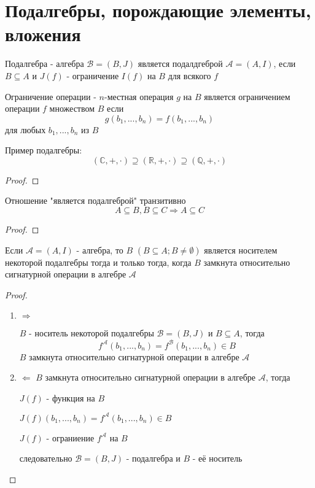 \documentclass[../main/document.tex]{subfiles}
\begin{document}
\section{Подалгебры, порождающие элементы,\\ вложения}

\begin{dfn}[Подалгебра]
Подалгебра - алгебра $\mathcal{B}=(B,J)$ является подалдгеброй $\mathcal{A}=(A,I)$, если $B\subseteq A$ и $J(f)$ - ограничение $I(f)$ на $B$ для всякого $f$
\end{dfn}
\begin{dfn}
Ограничение операции - $n$-местная операция $g$ на $B$ является ограничением операции $f$ множеством $B$ если 
$$g(b_1,...,b_n)=f(b_1,...,b_n)$$
для любых $b_1,...,b_n$ из $B$
\end{dfn}
\begin{exm}

\end{exm}
\begin{exm}
Пример подалгебры:
$$(\mathbb{C},+,\cdot)\supseteq (\mathbb{R},+,\cdot)\supseteq (\mathbb{Q},+,\cdot)$$
\begin{proof}

\end{proof}
\end{exm}
\begin{cnsq}
Отношение "является подалгеброй" транзитивно
$$A\subseteq B, B\subseteq C \Rightarrow A\subseteq C$$
\begin{proof}

\end{proof}
\end{cnsq}
\begin{thm}\label{carrier-theorem}
Если $\mathcal{A}=(A,I)$ - алгебра, то $B$ $(B\subseteq A; B\neq \emptyset)$ является носителем некоторой подалгебры тогда и только тогда, когда $B$ замкнута относительно сигнатурной операции в алгебре $\mathcal{A}$
\begin{proof}
\begin{enumerate}
\item $\Rightarrow$

$B$ - носитель некоторой подалгебры $\mathcal{B}=(B,J)$ и $B\subseteq A$, тогда
$$f^{\mathcal{A}}(b_1,...,b_n)=f^{\mathcal{B}}(b_1,...,b_n)\in B$$
$B$ замкнута относительно сигнатурной операции в алгебре $\mathcal{A}$
\item $\Leftarrow$
$B$ замкнута относительно сигнатурной операции в алгебре $\mathcal{A}$, тогда

$J(f)$ - функция на $B$

$J(f)(b_1,...,b_n)=f^{\mathcal{A}}(b_1,...,b_n)\in B$

$J(f)$ - ограниение $f^{\mathcal{A}}$  на $B$

следовательно $\mathcal{B}=(B,J)$ - подалгебра и $B$ - её носитель
\end{enumerate}
\end{proof}
\end{thm}
\end{document}
